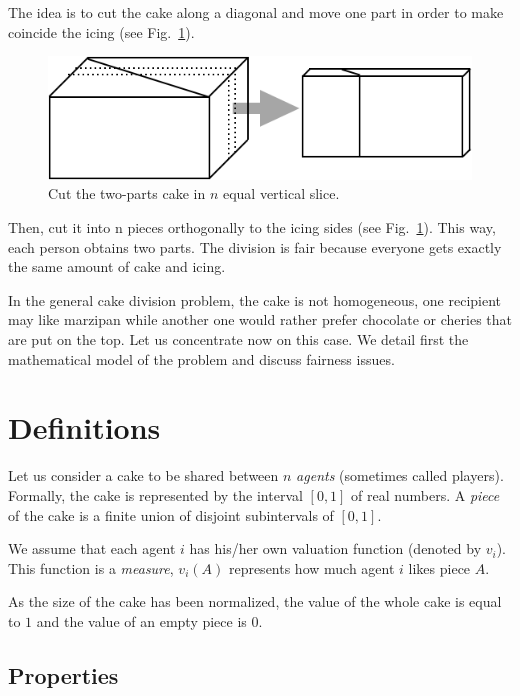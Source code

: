\begin{itemize}
\begin{figure}[htb]
\end{figure}
The idea is to cut the cake along a diagonal and move one part in order to make coincide the icing
(see Fig.~\ref{Fig:cakeHomogeneous3}).
\begin{figure}[htb]
\begin{center}
        \includegraphics[scale=0.4]{FiguresMaths/CakeHomogeneous3}
        \caption{Cut the two-parts cake in $n$ equal vertical slice.}
        \label{Fig:cakeHomogeneous3}
\end{center}
\end{figure}
Then, cut it into n pieces orthogonally to the icing sides (see Fig.~\ref{Fig:cakeHomogeneous3}). 
This way, each person obtains two parts. 
The division is fair because everyone gets exactly the same amount of cake and icing. 
\end{itemize}

In the general cake division problem, the cake is not homogeneous, 
one recipient may like marzipan while another one would rather prefer chocolate or cheries
that are put on the top.
Let us concentrate now on this case.
We detail first the mathematical model of the problem and discuss fairness issues. 

\section{Definitions}

Let us consider a cake to be shared between $n$ \textit{agents} (sometimes called players). 
Formally, the cake is represented by the interval $[0,1]$ of real numbers.
A \textit{piece} of the cake is a finite union of disjoint subintervals of $[0,1]$.

We assume that each agent $i$ has his/her own valuation function (denoted by $v_i$).
This function is a \textit{measure}, $v_i(A)$ represents how much agent $i$ likes piece $A$. 

As the size of the cake has been normalized, the value of the whole cake is equal to $1$
and the value of an empty piece is $0$.

\subsection{Properties}

